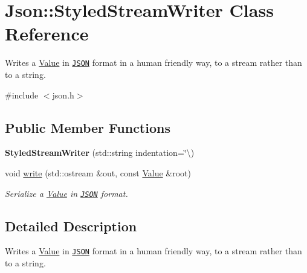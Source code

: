\hypertarget{class_json_1_1_styled_stream_writer}{}\section{Json\+:\+:Styled\+Stream\+Writer Class Reference}
\label{class_json_1_1_styled_stream_writer}


Writes a \hyperlink{class_json_1_1_value}{Value} in \href{http://www.json.org}{\tt J\+S\+ON} format in a human friendly way, to a stream rather than to a string.  




{\ttfamily \#include $<$json.\+h$>$}

\subsection*{Public Member Functions}
\begin{DoxyCompactItemize}
\item 
\mbox{\label{class_json_1_1_styled_stream_writer_ae70975badffb647580963146de0b1cfc}} 
{\bfseries Styled\+Stream\+Writer} (std\+::string indentation=\char`\"{}\textbackslash{})
\item 
void \hyperlink{class_json_1_1_styled_stream_writer_a07807741c6c43ecd35885a87234d0805}{write} (std\+::ostream \&out, const \hyperlink{class_json_1_1_value}{Value} \&root)
\begin{DoxyCompactList}\small\item\em Serialize a \hyperlink{class_json_1_1_value}{Value} in \href{http://www.json.org}{\tt J\+S\+ON} format. \end{DoxyCompactList}\end{DoxyCompactItemize}


\subsection{Detailed Description}
Writes a \hyperlink{class_json_1_1_value}{Value} in \href{http://www.json.org}{\tt J\+S\+ON} format in a human friendly way, to a stream rather than to a string. 


